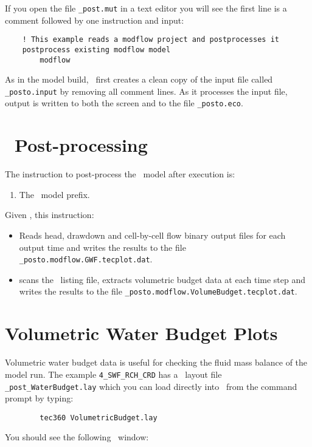 If you open the file \texttt{\_post.mut} in a text editor you will see the first  line is a comment followed by one instruction and input:
\squish
\begin{verbatim}
    ! This example reads a modflow project and postprocesses it
    postprocess existing modflow model
        modflow
\end{verbatim}
As in the model build, \mut\ first creates a clean copy of the input file called \texttt{\_posto.input} by removing all comment lines.
 As it processes the input file, output is written to both the screen and to the file \texttt{\_posto.eco}.

\section{\mut\ Post-processing}
The instruction to post-process the \mfus\ model after execution is:

    {
        \squish
        \begin{enumerate}
        \item {}  The \mfus\ model prefix.
        \end{enumerate}
        Given , this instruction:
         \begin{itemize}
            \item  Reads head, drawdown and cell-by-cell flow binary output files for each output time and writes the results to the file {\tt \_posto.modflow.GWF.tecplot.dat}.
            \item scans the \mfus\ listing file, extracts volumetric budget data at each time step and writes the results to the file {\tt \_posto.modflow.VolumeBudget.tecplot.dat}.
         \end{itemize}
        \squish
    }

\section{Volumetric Water Budget Plots}
Volumetric water budget data is useful for checking the fluid mass balance of the model run.  The example {\tt 4\_SWF\_RCH\_CRD} has a \tecplot\ layout file {\tt \_post\_WaterBudget.lay} which you can load directly into \tecplot\ from the command prompt by typing:
    \begin{verbatim}
        tec360 VolumetricBudget.lay
    \end{verbatim}
You should see the following \tecplot\ window:    

